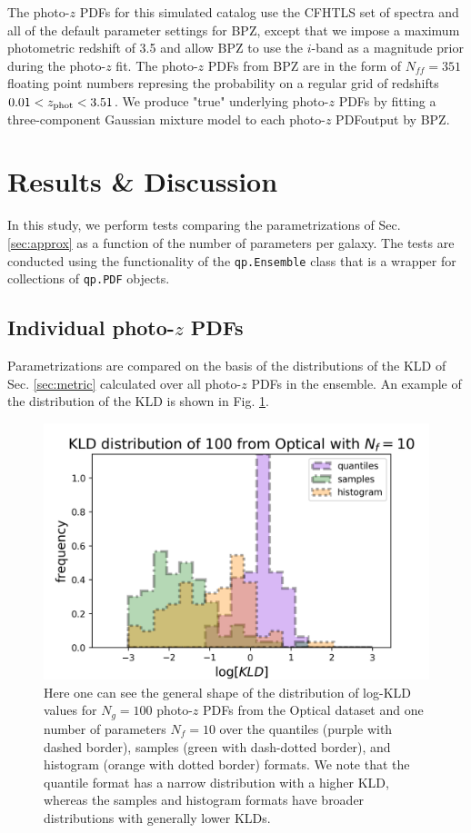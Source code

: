 \documentclass[\docopts]{\docclass}
\newcommand{\pz}{photo-$z$ PDF}
\begin{document}
The \pz s for this simulated catalog use the CFHTLS set of spectra 
\citep{ilbert_accurate_2006} and all of the default parameter settings for BPZ, 
except that we impose a maximum photometric redshift of 3.5 and allow BPZ to 
use the $i$-band as a magnitude prior during the photo-$z$ fit. The \pz s from 
BPZ are in the form of $N_{ff} = 351$ floating point numbers represing the 
probability on a regular grid of redshifts $0.01 < z_{\rm phot} < 3.51$.  We 
produce "true" underlying \pz s by fitting a three-component Gaussian mixture 
model to each \pz output by BPZ.



\section{Results \& Discussion}
\label{sec:results}


In this study, we perform tests comparing the parametrizations of Sec. 
\ref{sec:approx} as a function of the number of parameters per galaxy.  The 
tests are conducted using the functionality of the \texttt{qp.Ensemble} class 
that is a wrapper for collections of \texttt{qp.PDF} objects.


\subsection{Individual \pz s}
\label{sec:individual}

Parametrizations are compared on the basis of the distributions of the KLD of 
Sec. \ref{sec:metric} calculated over all \pz s in the ensemble.  An example of 
the distribution of the KLD is shown in Fig. \ref{fig:individual}.

\begin{figure}
  \includegraphics[width=0.9\columnwidth]{figures/lsst_individual.png}
  \caption{Here one can see the general shape of the distribution of log-KLD 
values for $N_{g}=100$ \pz s from the Optical dataset and one number of 
parameters $N_{f}=10$ over the quantiles (purple with dashed border), samples 
(green with dash-dotted border), and histogram (orange with dotted border) 
formats.  We note that the quantile format has a narrow distribution with a 
higher KLD, whereas the samples and histogram formats have broader 
distributions with generally lower KLDs.
  \label{fig:individual}}
\end{figure}
\end{document}
